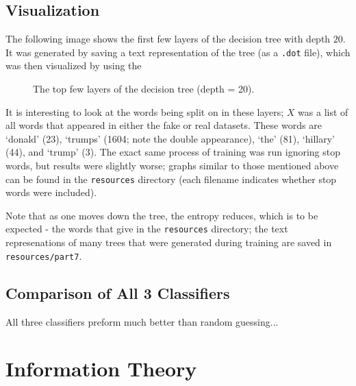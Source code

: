 \documentclass{article}
\begin{document}
   \subsection{Visualization}
   The following image shows the first few layers of the decision tree with depth $20$. It was generated by saving
   a text representation of the tree (as a \texttt{.dot} file), which was then visualized by using the
      \begin{figure}[h] \centering
         \caption{The top few layers of the decision tree (depth = 20).}
      \end{figure}

   It is interesting to look at the words being split on in these layers; $X$ was a list of all words
   that appeared in either the fake or real datasets. These words are `donald' (23), `trumps' (1604; note the
   double appearance), `the' (81), `hillary' (44), and `trump' (3). The exact same process of training was run
   ignoring stop words, but results were slightly worse; graphs similar to those mentioned above can be found
   in the \texttt{resources} directory (each filename indicates whether stop words were included).

   Note that as one moves down the tree, the entropy reduces, which is to be expected - the words that give
   in the \texttt{resources} directory; the text represenations of many trees that were generated during
   training are saved in \texttt{resources/part7}.

   \subsection{Comparison of All 3 Classifiers}
   All three classifiers preform much better than random guessing...


   \section{Information Theory}
\end{document}
